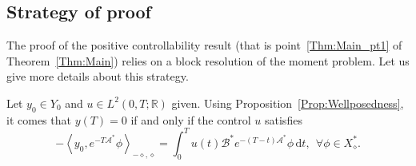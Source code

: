 \documentclass[AHL,Unicode,longabstracts]{cedram}
\newcommand\As{\mathcal{A}^*}
\newcommand\Bs{\mathcal{B}^*}
\newcommand{\Xalphas}{X_\diamond^*}
\newcommand{\Fzp}{Y_0}
\newcommand{\dual}[2]{\left\langle #1, #2 \right\rangle_{-\diamond,\diamond}}
\newcommand{\R}{\mathbb{R}}
\newcommand{\md}{\mathrm{d}}
\let\oldforall\forall
\renewcommand*{\forall}{\mathrel{\oldforall}}
\begin{document}
\subsection{Strategy of proof} \label{Subsec:Strategy}


The proof of the positive controllability result (that is point~\eqref{Thm:Main_pt1} of Theorem~\ref{Thm:Main}) relies on a block resolution of the moment problem. Let us give more details about this strategy.

Let $y_0\in \Fzp$ and $u\in L^2(0,T;\R)$ given. Using Proposition~\ref{Prop:Wellposedness}, it comes that $y(T)=0$ if and only if the control $u$ satisfies
\begin{equation}\label{premiere_equation_dualite}
- \dual{y_0}{e^{-T \As} \phi} = \int_0^T u(t) \Bs e^{-(T-t) \As} \phi\, \md t, \ \ \forall \phi\in \Xalphas.
\end{equation}
\end{document}

